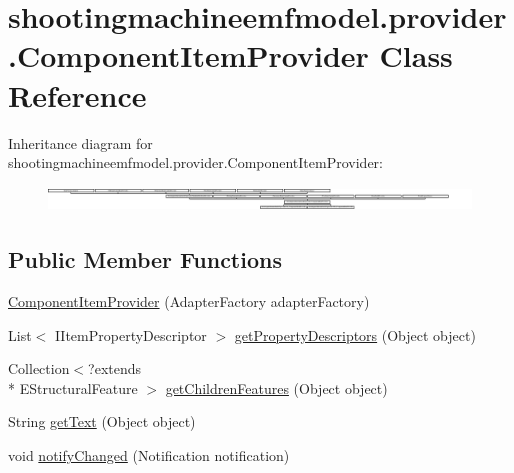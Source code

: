 \hypertarget{classshootingmachineemfmodel_1_1provider_1_1_component_item_provider}{\section{shootingmachineemfmodel.\-provider.\-Component\-Item\-Provider Class Reference}
\label{classshootingmachineemfmodel_1_1provider_1_1_component_item_provider}
}
Inheritance diagram for shootingmachineemfmodel.\-provider.\-Component\-Item\-Provider\-:\begin{figure}[H]
\begin{center}
\leavevmode
\includegraphics[height=0.649840cm]{classshootingmachineemfmodel_1_1provider_1_1_component_item_provider}
\end{center}
\end{figure}
\subsection*{Public Member Functions}
\begin{DoxyCompactItemize}
\item 
\hyperlink{classshootingmachineemfmodel_1_1provider_1_1_component_item_provider_a9955c1ff0c0ebc7d2973e14edfdc672b}{Component\-Item\-Provider} (Adapter\-Factory adapter\-Factory)
\item 
List$<$ I\-Item\-Property\-Descriptor $>$ \hyperlink{classshootingmachineemfmodel_1_1provider_1_1_component_item_provider_a6a12a924c12b5e2605bd6a65855d59de}{get\-Property\-Descriptors} (Object object)
\item 
Collection$<$?extends \\*
E\-Structural\-Feature $>$ \hyperlink{classshootingmachineemfmodel_1_1provider_1_1_component_item_provider_a2153b53677ccfa3f9562b3dcb655890b}{get\-Children\-Features} (Object object)
\item 
String \hyperlink{classshootingmachineemfmodel_1_1provider_1_1_component_item_provider_a568ffb9f8ffd9d8acd2b8b381c804b6d}{get\-Text} (Object object)
\item 
void \hyperlink{classshootingmachineemfmodel_1_1provider_1_1_component_item_provider_ab044bb029366a4720defd37a889d43b4}{notify\-Changed} (Notification notification)
\end{DoxyCompactItemize}
